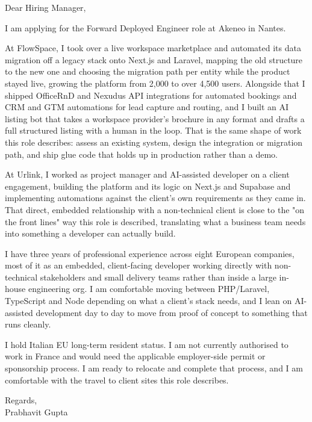 \documentclass[a4paper,11pt]{article}
\begin{document}
Dear Hiring Manager,

I am applying for the Forward Deployed Engineer role at Akeneo in Nantes.

At FlowSpace, I took over a live workspace marketplace and automated its data migration off a legacy stack onto Next.js and Laravel, mapping the old structure to the new one and choosing the migration path per entity while the product stayed live, growing the platform from 2,000 to over 4,500 users. Alongside that I shipped OfficeRnD and Nexudus API integrations for automated bookings and CRM and GTM automations for lead capture and routing, and I built an AI listing bot that takes a workspace provider's brochure in any format and drafts a full structured listing with a human in the loop. That is the same shape of work this role describes: assess an existing system, design the integration or migration path, and ship glue code that holds up in production rather than a demo.

At Urlink, I worked as project manager and AI-assisted developer on a client engagement, building the platform and its logic on Next.js and Supabase and implementing automations against the client's own requirements as they came in. That direct, embedded relationship with a non-technical client is close to the "on the front lines" way this role is described, translating what a business team needs into something a developer can actually build.

I have three years of professional experience across eight European companies, most of it as an embedded, client-facing developer working directly with non-technical stakeholders and small delivery teams rather than inside a large in-house engineering org. I am comfortable moving between PHP/Laravel, TypeScript and Node depending on what a client's stack needs, and I lean on AI-assisted development day to day to move from proof of concept to something that runs cleanly.

I hold Italian EU long-term resident status. I am not currently authorised to work in France and would need the applicable employer-side permit or sponsorship process. I am ready to relocate and complete that process, and I am comfortable with the travel to client sites this role describes.

Regards,\\
Prabhavit Gupta
\end{document}
